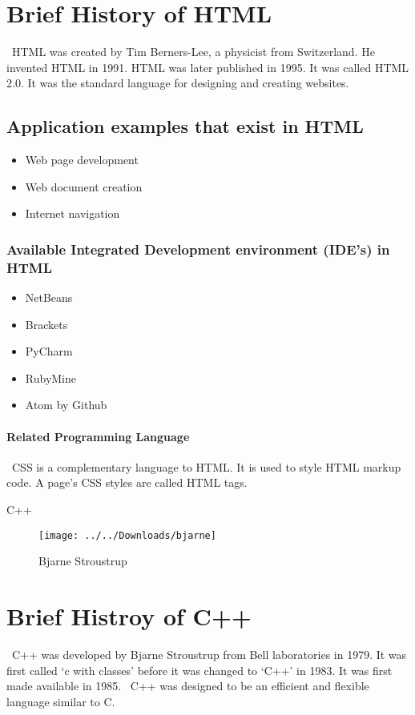 \documentclass{article}
\begin{document}
\section{Brief History of HTML}
\ HTML was created by Tim Berners-Lee, a physicist from Switzerland. He invented HTML in 1991. HTML was later published in 1995. It was called HTML 2.0. It was the standard language for designing and creating websites.
\subsection{Application examples that exist in HTML}
\begin{itemize}
	\item Web page development
	\item Web document creation
	\item Internet navigation
\end{itemize}
\subsubsection{Available Integrated Development environment (IDE’s) in HTML}
\begin{itemize}
	\item NetBeans
	\item Brackets
	\item PyCharm
	\item RubyMine
	\item Atom by Github
\end{itemize}
\paragraph{Related Programming Language}
\ CSS is a complementary language to HTML. It is used to style HTML markup code. A page’s CSS styles are called HTML tags.
\newpage
\begin{center}
	C++
\begin{figure}[h]
	\texttt{[image: ../../Downloads/bjarne]}
	\caption{Bjarne Stroustrup}
	\label{Founder of C++}
\end{figure}
\end{center}
\section{Brief Histroy of C++}
\ C++ was developed by Bjarne Stroustrup from Bell laboratories in 1979. It was first called ‘c with classes’ before it was changed to ‘C++’ in 1983. It was first made available in 1985. 
\ C++ was designed to be an efficient and flexible language similar to C.
\end{document}

